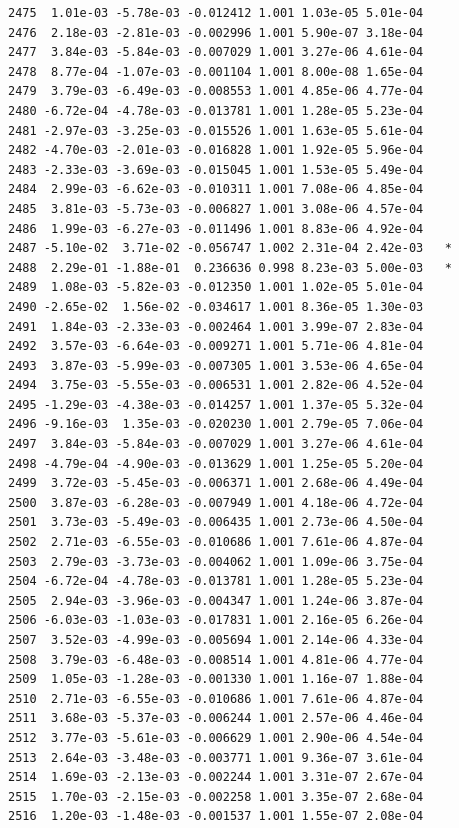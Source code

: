 \documentclass[
  letterpaper,
  DIV=11,
  numbers=noendperiod]{scrartcl}
\begin{document}
\begin{verbatim}
2475  1.01e-03 -5.78e-03 -0.012412 1.001 1.03e-05 5.01e-04    
2476  2.18e-03 -2.81e-03 -0.002996 1.001 5.90e-07 3.18e-04    
2477  3.84e-03 -5.84e-03 -0.007029 1.001 3.27e-06 4.61e-04    
2478  8.77e-04 -1.07e-03 -0.001104 1.001 8.00e-08 1.65e-04    
2479  3.79e-03 -6.49e-03 -0.008553 1.001 4.85e-06 4.77e-04    
2480 -6.72e-04 -4.78e-03 -0.013781 1.001 1.28e-05 5.23e-04    
2481 -2.97e-03 -3.25e-03 -0.015526 1.001 1.63e-05 5.61e-04    
2482 -4.70e-03 -2.01e-03 -0.016828 1.001 1.92e-05 5.96e-04    
2483 -2.33e-03 -3.69e-03 -0.015045 1.001 1.53e-05 5.49e-04    
2484  2.99e-03 -6.62e-03 -0.010311 1.001 7.08e-06 4.85e-04    
2485  3.81e-03 -5.73e-03 -0.006827 1.001 3.08e-06 4.57e-04    
2486  1.99e-03 -6.27e-03 -0.011496 1.001 8.83e-06 4.92e-04    
2487 -5.10e-02  3.71e-02 -0.056747 1.002 2.31e-04 2.42e-03   *
2488  2.29e-01 -1.88e-01  0.236636 0.998 8.23e-03 5.00e-03   *
2489  1.08e-03 -5.82e-03 -0.012350 1.001 1.02e-05 5.01e-04    
2490 -2.65e-02  1.56e-02 -0.034617 1.001 8.36e-05 1.30e-03    
2491  1.84e-03 -2.33e-03 -0.002464 1.001 3.99e-07 2.83e-04    
2492  3.57e-03 -6.64e-03 -0.009271 1.001 5.71e-06 4.81e-04    
2493  3.87e-03 -5.99e-03 -0.007305 1.001 3.53e-06 4.65e-04    
2494  3.75e-03 -5.55e-03 -0.006531 1.001 2.82e-06 4.52e-04    
2495 -1.29e-03 -4.38e-03 -0.014257 1.001 1.37e-05 5.32e-04    
2496 -9.16e-03  1.35e-03 -0.020230 1.001 2.79e-05 7.06e-04    
2497  3.84e-03 -5.84e-03 -0.007029 1.001 3.27e-06 4.61e-04    
2498 -4.79e-04 -4.90e-03 -0.013629 1.001 1.25e-05 5.20e-04    
2499  3.72e-03 -5.45e-03 -0.006371 1.001 2.68e-06 4.49e-04    
2500  3.87e-03 -6.28e-03 -0.007949 1.001 4.18e-06 4.72e-04    
2501  3.73e-03 -5.49e-03 -0.006435 1.001 2.73e-06 4.50e-04    
2502  2.71e-03 -6.55e-03 -0.010686 1.001 7.61e-06 4.87e-04    
2503  2.79e-03 -3.73e-03 -0.004062 1.001 1.09e-06 3.75e-04    
2504 -6.72e-04 -4.78e-03 -0.013781 1.001 1.28e-05 5.23e-04    
2505  2.94e-03 -3.96e-03 -0.004347 1.001 1.24e-06 3.87e-04    
2506 -6.03e-03 -1.03e-03 -0.017831 1.001 2.16e-05 6.26e-04    
2507  3.52e-03 -4.99e-03 -0.005694 1.001 2.14e-06 4.33e-04    
2508  3.79e-03 -6.48e-03 -0.008514 1.001 4.81e-06 4.77e-04    
2509  1.05e-03 -1.28e-03 -0.001330 1.001 1.16e-07 1.88e-04    
2510  2.71e-03 -6.55e-03 -0.010686 1.001 7.61e-06 4.87e-04    
2511  3.68e-03 -5.37e-03 -0.006244 1.001 2.57e-06 4.46e-04    
2512  3.77e-03 -5.61e-03 -0.006629 1.001 2.90e-06 4.54e-04    
2513  2.64e-03 -3.48e-03 -0.003771 1.001 9.36e-07 3.61e-04    
2514  1.69e-03 -2.13e-03 -0.002244 1.001 3.31e-07 2.67e-04    
2515  1.70e-03 -2.15e-03 -0.002258 1.001 3.35e-07 2.68e-04    
2516  1.20e-03 -1.48e-03 -0.001537 1.001 1.55e-07 2.08e-04    

\end{verbatim}
\end{document}

